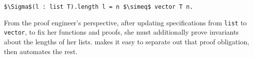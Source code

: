 \begin{lstlisting}
$\Sigma$(l : list T).length l = n $\simeq$ vector T n.
\end{lstlisting}
%
%
%
%
%
%
From the proof engineer's perspective, after updating specifications from \lstinline{list} to \lstinline{vector},
to fix her functions and proofs, she must additionally prove invariants about the lengths of her lists.
\toolname makes it easy to separate out that proof obligation, then automates the rest.

